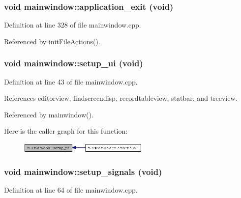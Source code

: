 \subsubsection{\setlength{\rightskip}{0pt plus 5cm}void mainwindow::application\_\-exit (void)\hspace{0.3cm}{\tt  [private, slot]}}\label{classmainwindow_2a9e00901bfba97614e2b80b37cb02db}




Definition at line 328 of file mainwindow.cpp.

Referenced by init\-File\-Actions().
\subsubsection{\setlength{\rightskip}{0pt plus 5cm}void mainwindow::setup\_\-ui (void)\hspace{0.3cm}{\tt  [private]}}\label{classmainwindow_f3d64dde81a35e22564d154736152b00}




Definition at line 43 of file mainwindow.cpp.

References editorview, findscreendisp, recordtableview, statbar, and treeview.

Referenced by mainwindow().

Here is the caller graph for this function:\begin{figure}[H]
\begin{center}
\leavevmode
\includegraphics[width=181pt]{classmainwindow_f3d64dde81a35e22564d154736152b00_icgraph}
\end{center}
\end{figure}
\subsubsection{\setlength{\rightskip}{0pt plus 5cm}void mainwindow::setup\_\-signals (void)\hspace{0.3cm}{\tt  [private]}}\label{classmainwindow_9e1c0ddaa70c6851ea20983c36adb52b}




Definition at line 64 of file mainwindow.cpp.

